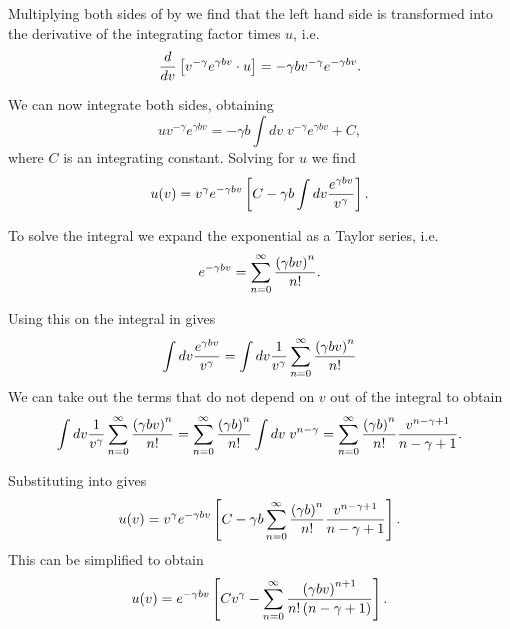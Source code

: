 Multiplying both sides of \eref[eq_dudv] by  we find
that the left hand side is transformed into the derivative of the integrating
factor times $u$, i.e.
\begin{equation}
  {d \over dv}\left[ v^{-\gamma} e^{\gamma b v} \cdot u \right] =
  -\gamma b v^{-\gamma} e^{-\gamma b v}.
\end{equation}

We can now integrate both sides, obtaining
\begin{equation}
u v^{-\gamma} e^{\gamma b v} =
-\gamma b \int dv \; v^{-\gamma} e^{\gamma b v} + C,
\end{equation}
where $C$ is an integrating constant. Solving for $u$ we find
\begin{equation}
  u(v) = v^{\gamma} e^{-\gamma b v} \left[ C -
  \gamma b \int dv {e^{\gamma b v} \over v^{\gamma}} \right].
  \label{eq_implicit_sol_u}
\end{equation}

To solve the integral we expand the exponential as a Taylor series, i.e.
\begin{equation}
  e^{-\gamma b v} = \sum_{n=0}^{\infty} {\left( \gamma b v \right)^n \over n!}.
\end{equation}

Using this on the integral in  gives
\begin{equation}
  \int dv {e^{\gamma b v} \over v^{\gamma}} =
  \int dv {1 \over v^{\gamma}}
  \sum_{n=0}^{\infty} {\left( \gamma b v \right)^n \over n!}
\end{equation}
We can take out the terms that do not depend on $v$ out of the integral to
obtain
\begin{equation}
\int dv {1 \over v^{\gamma}}
  \sum_{n=0}^{\infty} {\left( \gamma b v \right)^n \over n!} =
  \sum_{n=0}^{\infty} {\left( \gamma b \right)^n \over n!}
  \int dv \; v^{n - \gamma} =
  \sum_{n=0}^{\infty} {\left( \gamma b \right)^n \over n!}
  {v^{n - \gamma + 1} \over n - \gamma + 1}.
  \label{eq_integral_implicit_sol_u}
\end{equation}

Substituting  into 
gives
\begin{equation}
  u(v) = v^\gamma e^{-\gamma b v}
  \left[ C - \gamma b \sum_{n=0}^\infty {\left( \gamma b \right)^n \over n!}
  {v^{n - \gamma + 1} \over n - \gamma + 1} \right].
\end{equation}
This can be simplified to obtain
\begin{equation}
  u(v) = e^{-\gamma b v} \left[ C v^{\gamma}
  - \sum_{n=0}^\infty {\left( \gamma b v \right)^{n+1} \over
  n! \left( n - \gamma + 1 \right)} \right].
  \label{eq_SI_27_uofv}
\end{equation}

